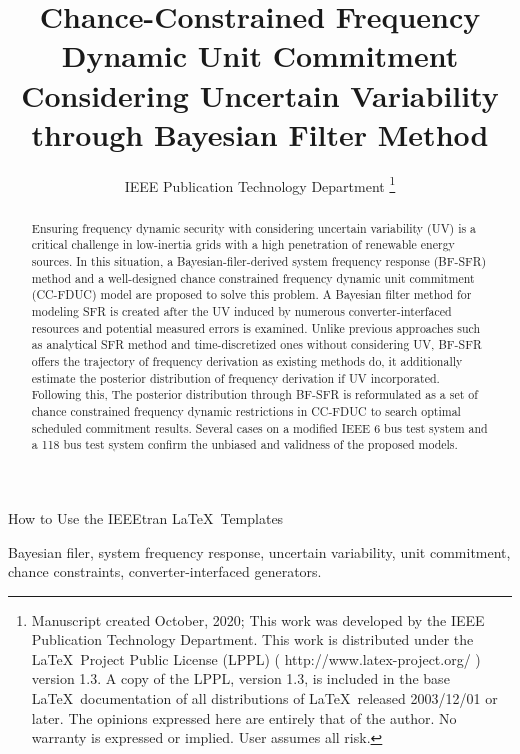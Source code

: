 \documentclass[lettersize,journal]{IEEEtran}
\begin{document}
\title{Chance-Constrained Frequency Dynamic Unit Commitment Considering Uncertain Variability through Bayesian Filter Method}
\author{IEEE Publication Technology Department
\thanks{Manuscript created October, 2020; This work was developed by the IEEE Publication Technology Department. This work is distributed under the \LaTeX \ Project Public License (LPPL) ( http://www.latex-project.org/ ) version 1.3. A copy of the LPPL, version 1.3, is included in the base \LaTeX \ documentation of all distributions of \LaTeX \ released 2003/12/01 or later. The opinions expressed here are entirely that of the author. No warranty is expressed or implied. User assumes all risk.}}

%
{How to Use the IEEEtran \LaTeX \ Templates}

\maketitle

\begin{abstract}
Ensuring frequency dynamic security with considering uncertain variability (UV) is a critical challenge in low-inertia grids with a high penetration of renewable energy sources. In this situation, a Bayesian-filer-derived system frequency response (BF-SFR) method and a well-designed chance constrained frequency dynamic unit commitment (CC-FDUC) model are proposed to solve this problem. A Bayesian filter method for modeling SFR is created after the UV induced by numerous converter-interfaced resources and potential measured errors is examined. Unlike previous approaches such as analytical SFR method and time-discretized ones without considering UV, BF-SFR offers the trajectory of frequency derivation as existing methods do, it additionally estimate the posterior distribution of frequency derivation if UV incorporated. Following this, The posterior distribution through BF-SFR is reformulated as a set of chance constrained frequency dynamic restrictions in CC-FDUC to search optimal scheduled commitment results. Several cases on a modified IEEE 6 bus test system and a 118 bus test system confirm the unbiased and validness of the proposed models.
\end{abstract}

\begin{IEEEkeywords}
Bayesian filer, system frequency response, uncertain variability, unit commitment, chance constraints, converter-interfaced generators.
\end{IEEEkeywords}
\end{document}
